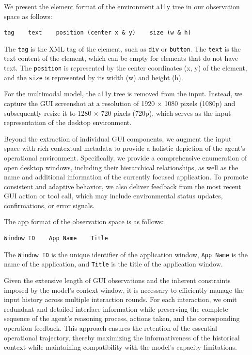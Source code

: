 We present the element format of the environment a11y tree in our observation space as follows:
\begin{lstlisting}
tag    text    position (center x & y)    size (w & h)
\end{lstlisting}

The \texttt{tag} is the XML tag of the element, such as \texttt{div} or \texttt{button}. The \texttt{text} is the text content of the element, which can be empty for elements that do not have text. The \texttt{position} is represented by the center coordinates (x, y) of the element, and the \texttt{size} is represented by its width (w) and height (h).

For the multimodal model, the a11y tree is removed from the input. Instead, we capture the GUI screenshot at a resolution of 1920 × 1080 pixels (1080p) and subsequently resize it to 1280 × 720 pixels (720p), which serves as the input representation of the desktop environment. 

Beyond the extraction of individual GUI components, we augment the input space with rich contextual metadata to provide a holistic depiction of the agent’s operational environment. Specifically, we provide a comprehensive enumeration of open desktop windows, including their hierarchical relationships, as well as the name and additional information of the currently focused application. To promote consistent and adaptive behavior, we also deliver feedback from the most recent GUI action or tool call, which may include environmental status updates, confirmations, or error signals.

The app format of the observation space is as follows:
\begin{lstlisting}
Window ID    App Name    Title
\end{lstlisting}

The \texttt{Window ID} is the unique identifier of the application window, \texttt{App Name} is the name of the application, and \texttt{Title} is the title of the application window.

Given the extensive length of GUI observations and the inherent constraints imposed by the model’s context window, it is necessary to efficiently manage the input history across multiple interaction rounds. For each interaction, we omit redundant and detailed interface information while preserving the complete sequence of the agent’s reasoning process, actions taken, and the corresponding operation feedback. This approach ensures the retention of the essential operational trajectory, thereby maximizing the informativeness of the historical context while maintaining compatibility with the model’s capacity limitations.

